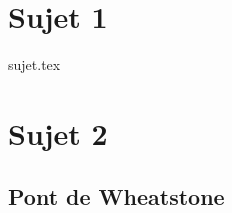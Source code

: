 \documentclass[a4paper, 11pt]{book}
\begin{document}

\chapter{Sujet 1}

\resetQ
{sujet.tex}

\chapter{Sujet 2}

\resetQ
\section{Pont de Wheatstone}
\end{document}
